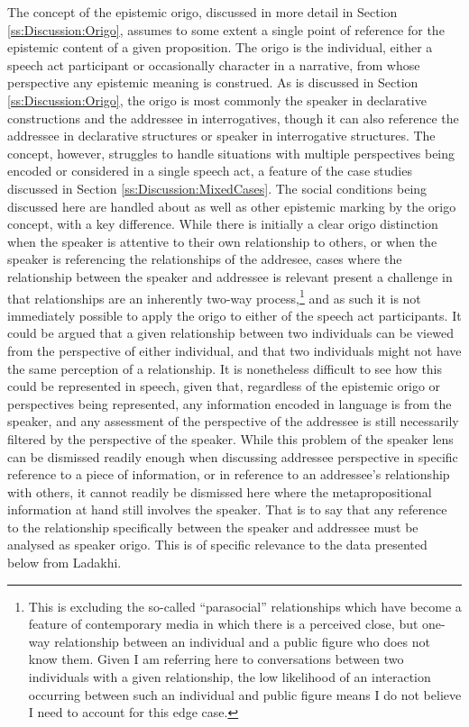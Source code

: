 The concept of the epistemic origo, discussed in more detail in Section \ref{ss:Discussion:Origo}, assumes to some extent a single point of reference for the epistemic content of a given proposition. The origo is the individual, either a speech act participant or occasionally character in a narrative, from whose perspective any epistemic meaning is construed. As is discussed in Section \ref{ss:Discussion:Origo}, the origo is most commonly the speaker in declarative constructions and the addressee in interrogatives, though it can also reference the addressee in declarative structures or speaker in interrogative structures. The concept, however, struggles to handle situations with multiple perspectives being encoded or considered in a single speech act, a feature of the case studies discussed in Section \ref{ss:Discussion:MixedCases}. The social conditions being discussed here are handled about as well as other epistemic marking by the origo concept, with a key difference. While there is initially a clear origo distinction when the speaker is attentive to their own relationship to others, or when the speaker is referencing the relationships of the addresee, cases where the relationship between the speaker and addressee is relevant present a challenge in that relationships are an inherently two-way process,\footnote{This is excluding the so-called ``parasocial'' relationships which have become a feature of contemporary media in which there is a perceived close, but one-way relationship between an individual and a public figure who does not know them. Given I am referring here to conversations between two individuals with a given relationship, the low likelihood of an interaction occurring between such an individual and public figure means I do not believe I need to account for this edge case.} and as such it is not immediately possible to apply the origo to either of the speech act participants. It could be argued that a given relationship between two individuals can be viewed from the perspective of either individual, and that two individuals might not have the same perception of a relationship. It is nonetheless difficult to see how this could be represented in speech, given that, regardless of the epistemic origo or perspectives being represented, any information encoded in language is from the speaker, and any assessment of the perspective of the addressee is still necessarily filtered by the perspective of the speaker. While this problem of the speaker lens can be dismissed readily enough when discussing addressee perspective in specific reference to a piece of information, or in reference to an addressee's relationship with others, it cannot readily be dismissed here where the metapropositional information at hand still involves the speaker. That is to say that any reference to the relationship specifically between the speaker and addressee must be analysed as speaker origo. This is of specific relevance to the data presented below from Ladakhi. 

